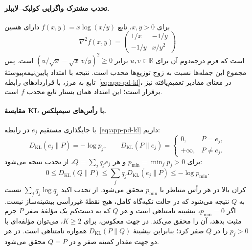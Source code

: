 \paragraph{تحدب مشترک واگرایی کولبک--لایبلر.}
برای $x,y>0$، تابع $f(x,y)=x\log(x/y)$ دارای هسین
\begin{equation}\label{eq:app-pd-kl-joint-convexity}
\nabla^2 f(x,y)=
\begin{pmatrix}1/x&-1/y\\-1/y&x/y^2\end{pmatrix}
\end{equation}
است که فرم درجه‌دوم آن برای $u,v\in\mathbb R$
برابر $(u/\sqrt{x}-\sqrt{x}\,v/y)^2\ge0$ است.
پس مجموع این جمله‌ها نسبت به زوج توزیع‌ها محدب است.
نتیجه با امتداد پایین‌نیمه‌پیوستهٔ تابع به مرز، با
قراردادهای رابطه~\eqref{eq:app-pd-kl}، در معنای
مقادیر تعمیم‌یافته نیز برقرار است؛ این امتداد همان
بستار تابع محدب $f$ است.

\paragraph{مقایسهٔ KL با رأس‌های سیمپلکس.}
با جایگذاری مستقیم $e_j$ در رابطه~\eqref{eq:app-pd-kl}
داریم:
\begin{equation}\label{eq:app-pd-kl-vertex-values}
D_{\mathrm{KL}}(e_j\|P)=-\log p_j,\qquad
D_{\mathrm{KL}}(P\|e_j)=
\begin{cases}
0,&P=e_j,\\
+\infty,&P\ne e_j.
\end{cases}
\end{equation}
برای $p_{\min}=\min_jp_j>0$ و هر $Q=\sum_jq_je_j$،
از تحدب نتیجه می‌شود:
\begin{equation}\label{eq:app-pd-kl-fixed-distribution-bound}
0\le D_{\mathrm{KL}}(Q\|P)
\le\sum_jq_jD_{\mathrm{KL}}(e_j\|P)
\le-\log p_{\min}.
\end{equation}
کران بالا در هر رأس متناظر با $p_{\min}$ محقق
می‌شود. از تحدب اکید $\sum_j q_j\log q_j$ نسبت
به $Q$ نتیجه می‌شود که در حالت تکیه‌گاه کامل،
هیچ نقطهٔ غیررأسی بیشینه‌ساز نیست. اگر $p_{\min}=0$،
بیشینه نامتناهی است و هر $Q$ که به دست‌کم یک
مؤلفهٔ صفر $P$ جرم مثبت بدهد، آن را محقق می‌کند.
در جهت معکوس، برای $K\ge2$، می‌توان مؤلفه‌ای
با $p_j>0$ را در $Q$ صفر کرد؛ بنابراین
بیشینهٔ $D_{\mathrm{KL}}(P\|Q)$ همواره نامتناهی است.
در هر دو جهت مقدار کمینه صفر و در $Q=P$ محقق می‌شود.

